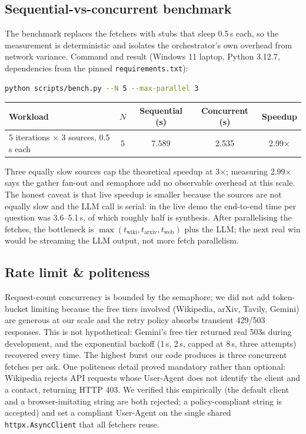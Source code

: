 \documentclass[11pt,a4paper]{article}
\begin{document}
\subsection{Sequential-vs-concurrent benchmark}

The benchmark replaces the fetchers with stubs that sleep 0.5\,s each, so the measurement is deterministic and isolates the orchestrator's own overhead from network variance. Command and result (Windows 11 laptop, Python 3.12.7, dependencies from the pinned \texttt{requirements.txt}):

\begin{lstlisting}[style=python,language=bash,numbers=none]
python scripts/bench.py --N 5 --max-parallel 3
\end{lstlisting}

\begin{center}\small
\begin{tabular}{lcccc}
\toprule
\textbf{Workload} & $N$ & \textbf{Sequential (s)} & \textbf{Concurrent (s)} & \textbf{Speedup} \\
\midrule
5 iterations $\times$ 3 sources, 0.5\,s each & 5 & 7.589 & 2.535 & 2.99$\times$ \\
\bottomrule
\end{tabular}
\end{center}

Three equally slow sources cap the theoretical speedup at 3$\times$; measuring 2.99$\times$ says the gather fan-out and semaphore add no observable overhead at this scale. The honest caveat is that live speedup is smaller because the sources are not equally slow and the LLM call is serial: in the live demo the end-to-end time per question was 3.6--5.1\,s, of which roughly half is synthesis. After parallelising the fetches, the bottleneck is $\max(t_{\text{wiki}}, t_{\text{arxiv}}, t_{\text{web}})$ plus the LLM; the next real win would be streaming the LLM output, not more fetch parallelism.

\subsection{Rate limit \& politeness}

Request-count concurrency is bounded by the semaphore; we did not add token-bucket limiting because the free tiers involved (Wikipedia, arXiv, Tavily, Gemini) are generous at our scale and the retry policy absorbs transient 429/503 responses. This is not hypothetical: Gemini's free tier returned real 503s during development, and the exponential backoff (1\,s, 2\,s, capped at 8\,s, three attempts) recovered every time. The highest burst our code produces is three concurrent fetches per ask. One politeness detail proved mandatory rather than optional: Wikipedia rejects API requests whose User-Agent does not identify the client and a contact, returning HTTP 403. We verified this empirically (the default client and a browser-imitating string are both rejected; a policy-compliant string is accepted) and set a compliant User-Agent on the single shared \texttt{httpx.AsyncClient} that all fetchers reuse.
\end{document}
